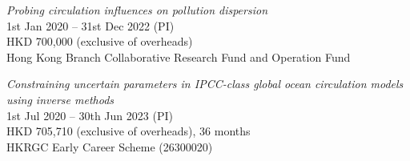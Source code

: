 \documentclass[letterpaper]{article}
\renewenvironment{itemize}{
  \begin{list}{}{
    \setlength{\leftmargin}{1.5em}
  }
}{
  \end{list}
}
\begin{document}
\begin{itemize}
\item[--] \textit{Probing circulation influences on pollution dispersion}\\
1st Jan 2020 -- 31st Dec 2022 (PI)\\
HKD 700,000 (exclusive of overheads)\\ 
Hong Kong Branch Collaborative Research Fund and Operation Fund

\item[--] \textit{Constraining uncertain parameters in IPCC-class global ocean
circulation models using inverse methods}\\
1st Jul 2020 -- 30th Jun 2023 (PI)\\
HKD 705,710 (exclusive of overheads), 36 months \\
HKRGC Early Career Scheme (26300020)

\end{itemize}


\end{document}
